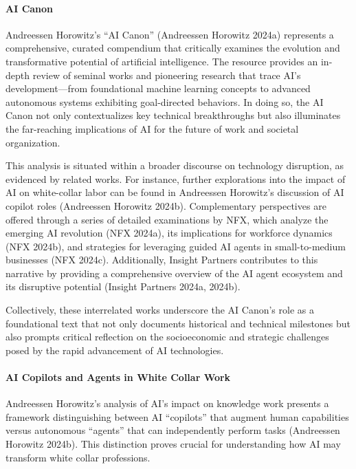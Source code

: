 \documentclass[
]{article}
\begin{document}
\paragraph{AI Canon}\label{ai-canon}

Andreessen Horowitz's ``AI Canon'' (Andreessen Horowitz 2024a)
represents a comprehensive, curated compendium that critically examines
the evolution and transformative potential of artificial intelligence.
The resource provides an in-depth review of seminal works and pioneering
research that trace AI's development---from foundational machine
learning concepts to advanced autonomous systems exhibiting
goal-directed behaviors. In doing so, the AI Canon not only
contextualizes key technical breakthroughs but also illuminates the
far-reaching implications of AI for the future of work and societal
organization.

This analysis is situated within a broader discourse on technology
disruption, as evidenced by related works. For instance, further
explorations into the impact of AI on white-collar labor can be found in
Andreessen Horowitz's discussion of AI copilot roles (Andreessen
Horowitz 2024b). Complementary perspectives are offered through a series
of detailed examinations by NFX, which analyze the emerging AI
revolution (NFX 2024a), its implications for workforce dynamics (NFX
2024b), and strategies for leveraging guided AI agents in
small-to-medium businesses (NFX 2024c). Additionally, Insight Partners
contributes to this narrative by providing a comprehensive overview of
the AI agent ecosystem and its disruptive potential (Insight Partners
2024a, 2024b).

Collectively, these interrelated works underscore the AI Canon's role as
a foundational text that not only documents historical and technical
milestones but also prompts critical reflection on the socioeconomic and
strategic challenges posed by the rapid advancement of AI technologies.

\paragraph{AI Copilots and Agents in White Collar
Work}\label{ai-copilots-and-agents-in-white-collar-work}

Andreessen Horowitz's analysis of AI's impact on knowledge work presents
a framework distinguishing between AI ``copilots'' that augment human
capabilities versus autonomous ``agents'' that can independently perform
tasks (Andreessen Horowitz 2024b). This distinction proves crucial for
understanding how AI may transform white collar professions.
\end{document}
